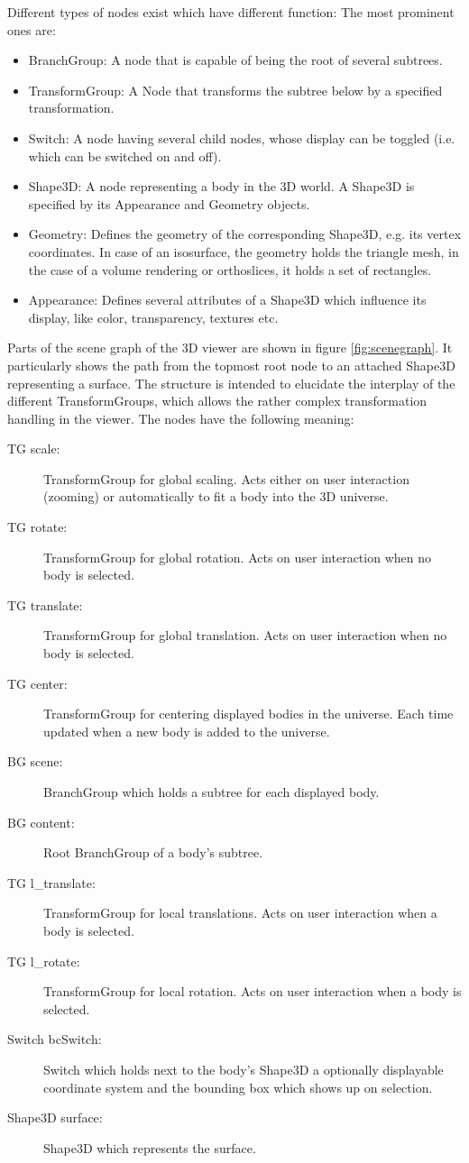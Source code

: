 \documentclass[a4paper,10pt]{article}
\begin{document}
Different types of nodes exist which have different function: The most prominent ones are:
\begin{itemize}
\item BranchGroup: A node that is capable of being the root of several subtrees.
\item TransformGroup: A Node that transforms the subtree below by a specified transformation.
\item Switch: A node having several child nodes, whose display can be toggled (i.e. which can be switched on and off).
\item Shape3D: A node representing a body in the 3D world. A Shape3D is specified by its Appearance and Geometry objects.
\item Geometry: Defines the geometry of the corresponding Shape3D, e.g. its vertex coordinates. In case of an isosurface, the geometry holds the triangle mesh, in the case of a volume rendering or orthoslices, it holds a set of rectangles.
\item Appearance: Defines several attributes of a Shape3D which influence its display, like color, transparency, textures etc.
\end{itemize}

Parts of the scene graph of the 3D viewer are shown in figure \ref{fig:scenegraph}. It particularly shows the path from the topmost root node to an attached Shape3D representing a surface. The structure is intended to elucidate the interplay of the different TransformGroups, which allows the rather complex transformation handling in the viewer. The nodes have the following meaning:

\begin{description}
\item[TG scale:] TransformGroup for global scaling. Acts either on user interaction (zooming) or automatically to fit a body into the 3D universe.
\item[TG rotate:] TransformGroup for global rotation. Acts on user interaction when no body is selected.
\item[TG translate:] TransformGroup for global translation. Acts on user interaction when no body is selected.
\item[TG center:] TransformGroup for centering displayed bodies in the universe. Each time updated when a new body is added to the universe.
\item[BG scene:] BranchGroup which holds a subtree for each displayed body.
\item[BG content:] Root BranchGroup of a body's subtree.
\item[TG l\_translate:]  TransformGroup for local translations. Acts on user interaction when a body is selected.
\item[TG l\_rotate:] TransformGroup for local rotation. Acts on user interaction when a body is selected.
\item[Switch bcSwitch:] Switch which holds next to the body's Shape3D a optionally displayable coordinate system and the bounding box which shows up on selection.
\item[Shape3D surface:] Shape3D which represents the surface.
\end{description}
\end{document}
